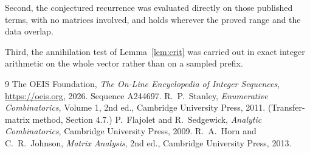 \documentclass[11pt,a4paper]{article}
\theoremstyle{plain}
\theoremstyle{definition}
\begin{document}
Second, the conjectured recurrence was evaluated directly on those published terms, with no
matrices involved, and holds wherever the proved range and the data overlap.

Third, the annihilation test of Lemma~\ref{lem:crit} was carried out in exact integer
arithmetic on the whole vector rather than on a sampled prefix.

\begin{thebibliography}{9}
 The OEIS Foundation, \emph{The On-Line Encyclopedia of Integer
Sequences}, \url{https://oeis.org}, 2026. Sequence A244697.
 R.~P.~Stanley, \emph{Enumerative Combinatorics}, Volume 1, 2nd ed.,
Cambridge University Press, 2011. (Transfer-matrix method, Section 4.7.)
 P.~Flajolet and R.~Sedgewick, \emph{Analytic Combinatorics}, Cambridge
University Press, 2009.
 R.~A.~Horn and C.~R.~Johnson, \emph{Matrix Analysis}, 2nd ed., Cambridge
University Press, 2013.
\end{thebibliography}
\end{document}
